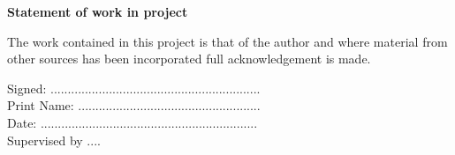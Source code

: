 \begin{center}
\textbf{\Large{Statement of work in project}}
\end{center}

\normalsize

The work contained in this project is that of the author and where
material from other sources has been incorporated full acknowledgement
is made.

\vspace{1cm}

Signed: .............................................................\\

Print Name: .....................................................\\

Date: ...............................................................\\


Supervised by ....